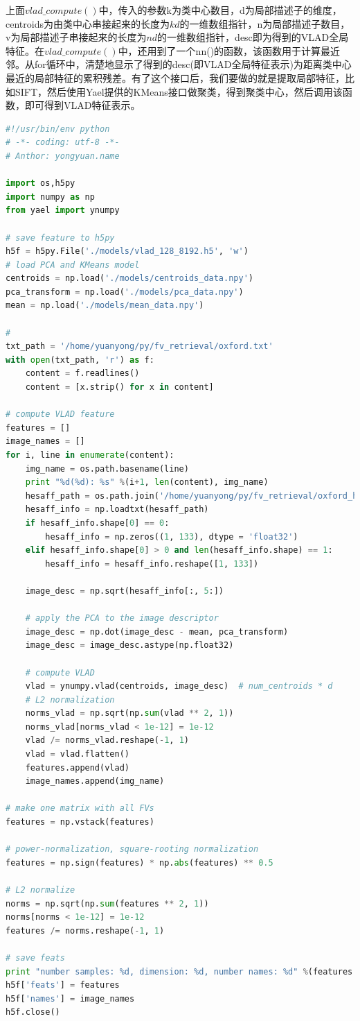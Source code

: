 \documentclass[color=cyan,mathpazo,titlestyle=hang]{elegantbook}
\begin{document}
上面$vlad\_compute()$中，传入的参数k为类中心数目，d为局部描述子的维度，centroids为由类中心串接起来的长度为$kd$的一维数组指针，n为局部描述子数目，v为局部描述子串接起来的长度为$nd$的一维数组指针，desc即为得到的VLAD全局特征。在$vlad\_compute()$中，还用到了一个nn()的函数，该函数用于计算最近邻。从for循环中，清楚地显示了得到的desc(即VLAD全局特征表示)为距离类中心最近的局部特征的累积残差。有了这个接口后，我们要做的就是提取局部特征，比如SIFT，然后使用Yael提供的KMeans接口做聚类，得到聚类中心，然后调用该函数，即可得到VLAD特征表示。

\begin{lstlisting}[language=python]
#!/usr/bin/env python
# -*- coding: utf-8 -*-
# Anthor: yongyuan.name

import os,h5py
import numpy as np
from yael import ynumpy

# save feature to h5py
h5f = h5py.File('./models/vlad_128_8192.h5', 'w')
# load PCA and KMeans model
centroids = np.load('./models/centroids_data.npy')
pca_transform = np.load('./models/pca_data.npy')
mean = np.load('./models/mean_data.npy')

#
txt_path = '/home/yuanyong/py/fv_retrieval/oxford.txt'
with open(txt_path, 'r') as f:
    content = f.readlines()
    content = [x.strip() for x in content]

# compute VLAD feature
features = []
image_names = []
for i, line in enumerate(content):
    img_name = os.path.basename(line)
    print "%d(%d): %s" %(i+1, len(content), img_name)
    hesaff_path = os.path.join('/home/yuanyong/py/fv_retrieval/oxford_hesaff_sift', os.path.splitext(os.path.basename(line))[0] + '.hesaff.sift')
    hesaff_info = np.loadtxt(hesaff_path)
    if hesaff_info.shape[0] == 0:
        hesaff_info = np.zeros((1, 133), dtype = 'float32')
    elif hesaff_info.shape[0] > 0 and len(hesaff_info.shape) == 1:
        hesaff_info = hesaff_info.reshape([1, 133])

    image_desc = np.sqrt(hesaff_info[:, 5:])

    # apply the PCA to the image descriptor
    image_desc = np.dot(image_desc - mean, pca_transform)
    image_desc = image_desc.astype(np.float32)

    # compute VLAD
    vlad = ynumpy.vlad(centroids, image_desc)  # num_centroids * d
    # L2 normalization
    norms_vlad = np.sqrt(np.sum(vlad ** 2, 1))
    norms_vlad[norms_vlad < 1e-12] = 1e-12
    vlad /= norms_vlad.reshape(-1, 1)
    vlad = vlad.flatten()
    features.append(vlad)
    image_names.append(img_name)

# make one matrix with all FVs
features = np.vstack(features)

# power-normalization, square-rooting normalization
features = np.sign(features) * np.abs(features) ** 0.5

# L2 normalize
norms = np.sqrt(np.sum(features ** 2, 1))
norms[norms < 1e-12] = 1e-12
features /= norms.reshape(-1, 1)

# save feats
print "number samples: %d, dimension: %d, number names: %d" %(features.shape[0], features.shape[1], len(image_names))
h5f['feats'] = features
h5f['names'] = image_names
h5f.close()
\end{lstlisting}
\end{document}
